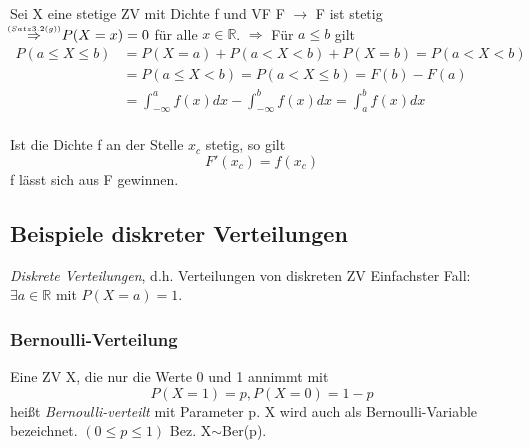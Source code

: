 \documentclass[a4paper,11pt]{article}
\newcommand\impthreetwog{\overset{\mathclap{\scriptscriptstyle (Satz 3.2(g))}}{\Rightarrow}}
\begin{document}
\vspace{6pt}
\noindent Sei X eine stetige ZV mit Dichte f und VF F
\newline $\rightarrow$ F ist stetig $\hspace{12pt}\impthreetwog\hspace{12pt} P(X=x)=0$ für alle $x\in\mathbb{R}$.
\newline $\Rightarrow$ Für $a\leq b$ gilt
\begin{align*}
P(a\leq X\leq b) &= P(X=a) + P(a<X<b) + P(X=b) = P(a<X<b)\\
&= P(a\leq X<b) = P(a<X\leq b) = F(b)-F(a)\\
&= \int_{-\infty}^{a}f(x)dx - \int_{-\infty}^{b}f(x)dx = \int_{a}^{b}f(x)dx\\
\end{align*}

\noindent Ist die Dichte f an der Stelle $x_c$ stetig, so gilt 
\[F'(x_c)=f(x_c)\]
f lässt sich aus F gewinnen.

\subsection{Beispiele diskreter Verteilungen}
\noindent\textit{Diskrete Verteilungen}, d.h. Verteilungen von diskreten ZV
\newline Einfachster Fall: $\exists a\in\mathbb{R}$ mit $P(X=a)=1$.


\subsubsection{Bernoulli-Verteilung}
\noindent Eine ZV X, die nur die Werte 0 und 1 annimmt mit 
\[P(X=1)=p, P(X=0)=1-p\]
heißt \textit{Bernoulli-verteilt} mit Parameter p.
\newline X wird auch als Bernoulli-Variable bezeichnet. $(0\leq p \leq 1)$
\newline Bez. X$\sim$Ber(p).
\end{document}

